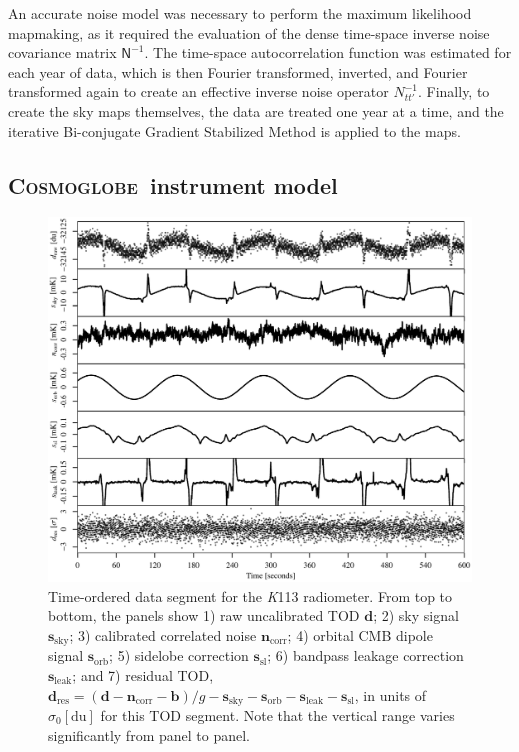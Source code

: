 \documentclass[twocolumn]{../../common/aa}
\newcommand{\cosmoglobe}{\textsc{Cosmoglobe}}
\newcommand{\K}[0]{\textit K}
\begin{document}
An accurate noise model was necessary to perform the maximum likelihood mapmaking, as it required the evaluation of the dense time-space inverse noise covariance matrix  $\mathsf N^{-1}$. The time-space autocorrelation function was estimated for each year of data, which is then Fourier transformed, inverted, and Fourier transformed again to create an effective inverse noise operator $N_{tt'}^{-1}$. 
Finally, to create the sky maps themselves, the data are treated one year at a time, and the iterative Bi-conjugate Gradient Stabilized Method \citep[BiCG-STAB][]{bicgstab,bicgstab_template} is applied to the maps.

\subsection{\cosmoglobe\ instrument model}
\label{sec:cosmoglobe_instmodel}

\begin{figure}
	\includegraphics[width=\textwidth]{figures/K113_timestreams.pdf}
	\caption{Time-ordered data segment for the \K113 radiometer. From top to bottom, the panels show 1) raw uncalibrated TOD $\boldsymbol d$; 2) sky signal $\boldsymbol s_\mathrm{sky}$; 3) calibrated correlated noise $\boldsymbol n_\mathrm{corr}$; 4) orbital CMB dipole signal $\boldsymbol s_\mathrm{orb}$; 5) sidelobe correction $\boldsymbol s_\mathrm{sl}$; 6) bandpass leakage correction $\boldsymbol s_\mathrm{leak}$; and 7) residual TOD, $\boldsymbol d_\mathrm{res}=(\boldsymbol d -\boldsymbol n_\mathrm{corr}-\boldsymbol b)/g-\boldsymbol s_\mathrm{sky}-\boldsymbol s_\mathrm{orb}-\boldsymbol s_\mathrm{leak} -\boldsymbol s_\mathrm{sl}$, in units of $\sigma_0[\mathrm{du}]$ for this TOD segment. Note that the vertical range varies significantly from panel to panel.
		}
	\label{fig:timestreams}
\end{figure}
\end{document}
